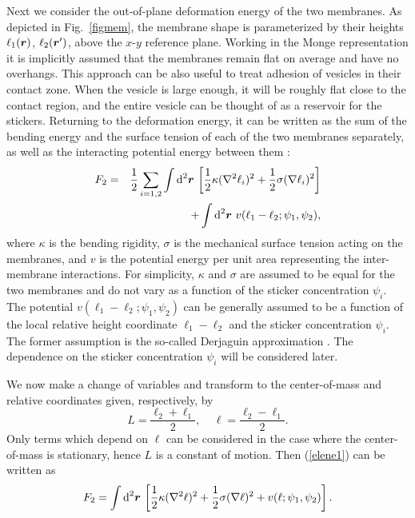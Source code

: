 Next we consider the out-of-plane deformation energy of the two
membranes. As depicted in Fig.\ \ref{figmem}, the  membrane shape
is parameterized by their heights $\ell_1(\mbox{\boldmath $r$})$,
$\ell_2(\mbox{\boldmath $r$}')$, above the  $x$-$y$ reference
plane. Working in the Monge representation it is implicitly
assumed that the membranes remain flat on average and have no
overhangs. This approach can be also useful to treat adhesion of
vesicles in their contact zone. When the vesicle is large enough,
it will be roughly flat close to the contact region, and the
entire vesicle can be thought of as a reservoir for the stickers.
Returning to the deformation energy, it can be written as the sum
of the bending energy and the surface tension of each of the two
membranes separately, as well as the interacting potential energy
between them \cite{Safran,BGP}:
\begin{eqnarray}
F_2 = & &  \frac{1}{2} \sum_{i=1,2} \int \mbox{d}^2
\mbox{\boldmath $r$} \, \left[ \frac{1}{2} \kappa (\nabla^2
\ell_i)^2  + \frac{1}{2} \sigma (\nabla \ell_i)^2  \right]
\nonumber \\ & & + \int \mbox{d}^2 \mbox{\boldmath $r$}~
v(\ell_1-\ell_2; \psi_1, \psi_2), \label{elene1}
\end{eqnarray}
where $\kappa$ is the bending rigidity, $\sigma$ is the mechanical
surface tension acting on the membranes, and $v$ is the potential
energy per unit area representing the inter-membrane interactions.
For simplicity, $\kappa$ and $\sigma$ are assumed to be equal for the two
membranes and do not vary as a function of the sticker concentration
$\psi_i$.
The potential $v(\ell_1-\ell_2; \psi_1, \psi_2)$ can be generally 
assumed to be a function of the local relative height coordinate 
$\ell_1-\ell_2$ and the sticker concentration $\psi_i$.
The former assumption is the so-called Derjaguin approximation \cite{Israel}.
The dependence on the sticker concentration $\psi_i$ will be considered later. 


We now make a change of variables and
transform to the center-of-mass and relative coordinates
given, respectively,  by
\begin{equation}
L = \frac{\ell_2+\ell_1}{2},~~~~~\ell = \frac{\ell_2-\ell_1}{2}.
\end{equation}
Only terms which depend on $\ell$ can be considered
in the case where the center-of-mass is stationary, hence
$L$ is a constant of motion.
Then (\ref{elene1}) can be written as \cite{rigidity}
\begin{equation}
F_2 = \int \mbox{d}^2 \mbox{\boldmath $r$} \, \left[ \frac{1}{2}
\kappa (\nabla^2 \ell)^2  + \frac{1}{2} \sigma (\nabla \ell)^2  +
v(\ell; \psi_1, \psi_2) \right]. \label{elene2}
\end{equation}


